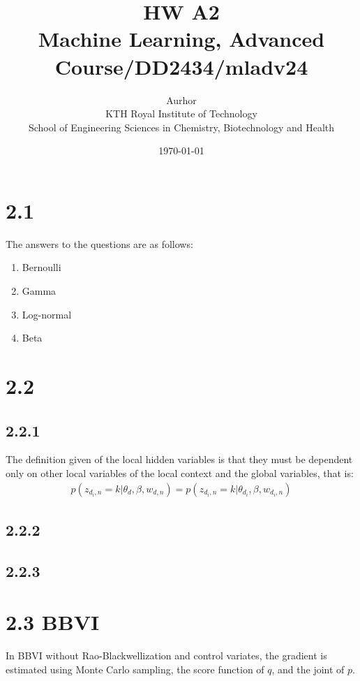 \documentclass{article}
\title{HW A2\\\Large{Machine Learning, Advanced Course/DD2434/mladv24}}
\author{Aurhor \\ KTH Royal Institute of Technology\\ School of Engineering Sciences in Chemistry, Biotechnology and Health}
\date{\today}
\begin{document}
\maketitle

\fancyfoot[C]{\thepage}
\begin{multicols}{2}

    \section*{2.1}
    The answers to the questions are as follows:
    \begin{enumerate}[noitemsep, topsep=0pt]
        \item Bernoulli
        \item Gamma
        \item Log-normal
        \item Beta
    \end{enumerate}
    \section*{2.2}
    \subsection*{2.2.1} 
    The definition given of the local hidden variables is that they must be dependent
    only on other local variables of the local context and the global variables, that is:
    \begin{align}
        p(z_{d_i,n} = k |\theta_d, \beta, w_{d,n}) = p(z_{d_i,n} = k | \theta_{d_i}, \beta, w_{d_i,n})
    \end{align}
    \subsection*{2.2.2}

    \subsection*{2.2.3}
    


\section*{2.3 BBVI}
In BBVI without Rao-Blackwellization and control variates, the gradient is estimated using Monte Carlo sampling, the score function of \(q\), and the joint of \(p\).


\end{multicols}
\end{document}
